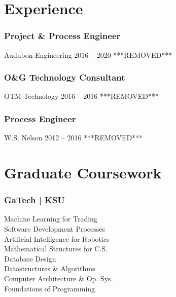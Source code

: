 \section{Experience}
  \position
    {\subsubsection{Project \& Process Engineer}}
    {Audubon Engineering}
    {2016 -- 2020}
    {***REMOVED***}%
  \position
    {\subsubsection{O\&G Technology Consultant}}
    {OTM Technology}
    {2016 -- 2016}
    {***REMOVED***}%
  \position
    {\subsubsection{Process Engineer}}
    {W.S. Nelson}
    {2012 -- 2016}
    {***REMOVED***}%
\section{Graduate Coursework}
  \subsubsection{GaTech | KSU}
      Machine Learning for Trading\\
      Software Development Processes\\
      Artificial Intelligence for Robotics\\
      Mathematical Structures for C.S.\\
      Database Design\\
      Datastructures \& Algorithms\\
      Computer Architecture \& Op. Sys.\\
      Foundations of Programming\\